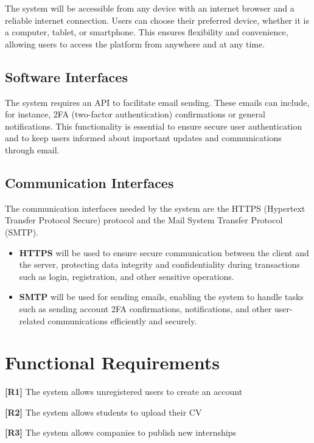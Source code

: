 The system will be accessible from any device with an internet browser and a reliable internet connection. Users can choose their preferred device, whether it is a computer, tablet, or smartphone. This ensures flexibility and convenience, allowing users to access the platform from anywhere and at any time.

\subsection{Software Interfaces}
The system requires an API to facilitate email sending. These emails can include, for instance, 2FA (two-factor authentication) confirmations or general notifications. This functionality is essential to ensure secure user authentication and to keep users informed about important updates and communications through email.
 
\subsection{Communication Interfaces}
The communication interfaces needed by the system are the HTTPS (Hypertext Transfer Protocol Secure) protocol and the Mail System Transfer Protocol (SMTP). 

\begin{itemize}
    \item \textbf{HTTPS} will be used to ensure secure communication between the client and the server, protecting data integrity and confidentiality during transactions such as login, registration, and other sensitive operations.
    
    \item \textbf{SMTP} will be used for sending emails, enabling the system to handle tasks such as sending account 2FA confirmations, notifications, and other user-related communications efficiently and securely.

\end{itemize}

\pagebreak
\section{Functional Requirements}

\textbf{[R1]} The system allows unregistered users to create an account

\textbf{[R2]} The system allows students to upload their CV

\textbf{[R3]} The system allows companies to publish new internships

